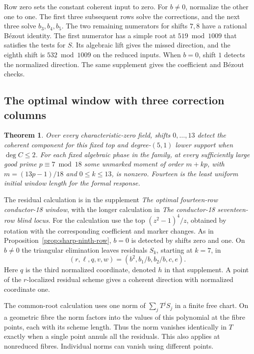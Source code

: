 \documentclass[11pt]{article}
\newtheorem{theorem}{Theorem}
\begin{document}
Row zero sets the constant coherent input to zero. For \(b\ne0\),
normalize the other one to one. The first three subsequent rows
solve the corrections, and the next three solve \(b_3,b_4,b_5\).
The two remaining numerators for shifts \(7,8\) have a rational
B\'ezout identity. The first numerator has a simple root at
\(519\bmod1009\) that satisfies the tests for \(S\). Its algebraic
lift gives the missed direction, and the eighth shift is
\(532\bmod1009\) on the reduced inputs. When \(b=0\), shift \(1\)
detects the normalized direction. The same supplement gives the
coefficient and B\'ezout checks.

\subsection{The optimal window with three correction columns}

\begin{theorem}\label{thm:optimal-fourteen-row}
Over every characteristic-zero field, shifts \(0,\ldots,13\)
detect the coherent component for this fixed top and
degree-\((5,1)\) lower support when \(\deg C\le2\).
For each fixed algebraic phase in the family, at every sufficiently
large good prime \(p\equiv7\bmod18\) some unmarked moment of
order \(m+kp\), with \(m=(13p-1)/18\) and \(0\le k\le13\),
is nonzero. Fourteen is the least uniform initial window length
for the formal response.
\end{theorem}

The residual calculation is in the supplement
\emph{The optimal fourteen-row conductor-18 window}, with the
longer calculation in \emph{The conductor-18 seventeen-row blind locus}. For the
calculation use the top \((z^2-1)^4/z\), obtained by rotation
with the corresponding coefficient and marker changes.
As in Proposition~\ref{prop:sharp-ninth-row}, \(b=0\) is
detected by shifts zero and one. On \(b\ne0\) the triangular
elimination leaves residuals \(S_k\), starting at \(k=7\), in
\[
 (r,\ell,q,v,w)=(b^2,b_1/b,b_2/b,c,e).
\]
Here \(q\) is the third normalized coordinate, denoted \(h\)
in that supplement. A point of the \(r\)-localized residual
scheme gives a coherent direction with normalized coordinate one.

The common-root calculation uses one norm of
\(\sum_j T^j S_j\) in a finite free chart. On a geometric
fibre the norm factors into the values of this polynomial at
the fibre points, each with its scheme length. Thus the norm
vanishes identically in \(T\) exactly when a single point
annuls all the residuals. This also applies at nonreduced
fibres. Individual norms can vanish using different points.
\end{document}
